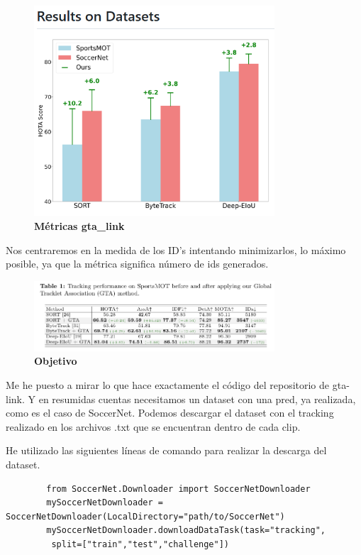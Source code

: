\documentclass[12pt, a4paper, twoside]{article}
\begin{document}
	\begin{figure}[h]
		\centering
		\includegraphics[width=0.8\textwidth]{image/metricasBeta}
		\caption{\textbf{Métricas gta\_link}}
		\label{fig:metricasBeta}
	\end{figure}
	
	Nos centraremos en la medida de los ID's intentando minimizarlos, lo máximo posible, ya que la métrica significa número de ids generados.
	
	\begin{figure}[h]
		\centering
		\includegraphics[width=0.8\textwidth]{image/Centrarse}
		\caption{\textbf{Objetivo}}
		\label{fig:Centrarse}
	\end{figure}
	
	Me he puesto a mirar lo que hace exactamente el código del repositorio de gta-link. Y en resumidas cuentas necesitamos un dataset con una pred, ya realizada, como es el caso de SoccerNet. Podemos descargar el dataset con el tracking realizado en los archivos .txt que se encuentran dentro de cada clip.\vspace{0.5cm}
	
	He utilizado las siguientes líneas de comando para realizar la descarga del dataset.
	
	\begin{verbatim}
		from SoccerNet.Downloader import SoccerNetDownloader
		mySoccerNetDownloader = SoccerNetDownloader(LocalDirectory="path/to/SoccerNet")
		mySoccerNetDownloader.downloadDataTask(task="tracking",
		 split=["train","test","challenge"])
	\end{verbatim}
	
\end{document}
